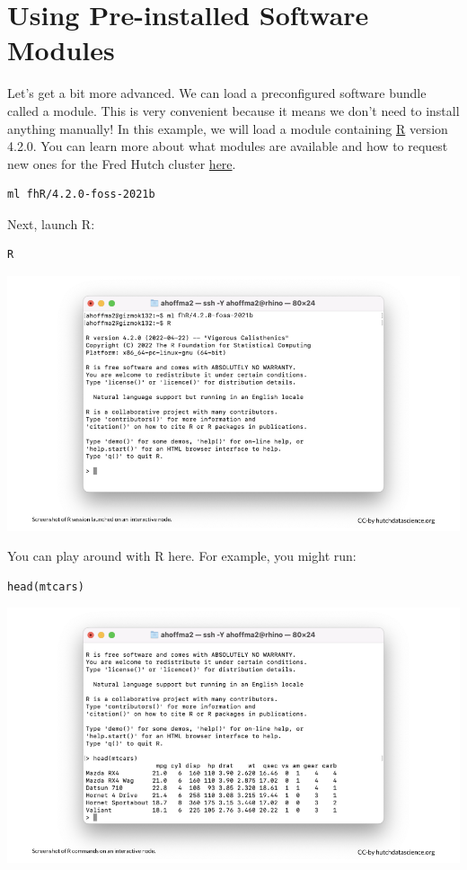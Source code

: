 \documentclass[
]{book}
\begin{document}
\hypertarget{using-pre-installed-software-modules}{%
\section{Using Pre-installed Software Modules}\label{using-pre-installed-software-modules}}

Let's get a bit more advanced. We can load a preconfigured software bundle called a module. This is very convenient because it means we don't need to install anything manually! In this example, we will load a module containing \href{https://www.r-project.org/}{R} version 4.2.0. You can learn more about what modules are available and how to request new ones for the Fred Hutch cluster \href{https://sciwiki.fredhutch.org/scicomputing/compute_scientificSoftware/}{here}.

\begin{verbatim}
ml fhR/4.2.0-foss-2021b
\end{verbatim}

Next, launch R:

\begin{verbatim}
R
\end{verbatim}

\includegraphics[width=1\linewidth]{resources/images/07-interactive_files/figure-latex//1BQxrVYdKZTbpCaF-i_q9w7s9x034lEXpQZDU-Sl09cs_gff2211b72f_1_65}

You can play around with R here. For example, you might run:

\begin{verbatim}
head(mtcars)
\end{verbatim}

\includegraphics[width=1\linewidth]{resources/images/07-interactive_files/figure-latex//1BQxrVYdKZTbpCaF-i_q9w7s9x034lEXpQZDU-Sl09cs_gff2211b72f_1_72}
\end{document}
